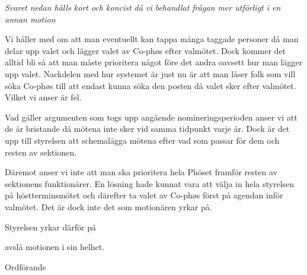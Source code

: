 \documentclass[../_main/handlingar.tex]{subfiles}
\begin{document}
\motionssvar
\textit{Svaret nedan hålls kort och koncist då vi behandlat frågan mer utförligt i en annan motion}

Vi håller med om att man eventuellt kan tappa många taggade personer då man delar upp valet och lägger valet av Co-phøs efter valmötet. Dock kommer det alltid bli så att man måste prioritera något före det andra oavsett hur man lägger upp valet. Nackdelen med hur systemet är just nu är att man låser folk som vill söka Co-phøs till att endast kunna söka den posten då valet sker efter valmötet. Vilket vi anser är fel.

Vad gäller argumenten som togs upp angående nomineringsperioden anser vi att de är bristande då mötena inte sker vid samma tidpunkt varje år. Dock är det upp till styrelsen att schemalägga mötena efter vad som passar för dem och resten av sektionen.

Däremot anser vi inte att man ska prioritera hela Phöset framför resten av sektionens funktionärer. En lösning hade kunnat vara att välja in hela styrelsen på höstterminsmötet och därefter ta valet av Co-phøs först på agendan inför valmötet. Det är dock inte det som motionären yrkar på.

Styrelsen yrkar därför på

\begin{attsatser}
    \att avslå motionen i sin helhet.
\end{attsatser}


\begin{signatures}{1}
	\ist
	\signature{Daniel Bakic}{Ordförande}
\end{signatures}
\end{document}
